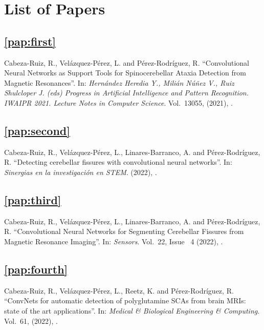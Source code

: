 \chapter{List of Papers}


\section*{\cref{pap:first}}
Cabeza-Ruiz, R., Velázquez-Pérez, L. and Pérez-Rodríguez, R.
\enquote{Convolutional Neural Networks as Support Tools for Spinocerebellar Ataxia Detection from Magnetic Resonances}.
In: \emph{Hernández Heredia Y., Milián Núñez V., Ruiz Shulcloper J. (eds) Progress in Artificial Intelligence and Pattern Recognition. IWAIPR 2021. Lecture Notes in Computer Science}.
Vol.\ 13055,
(2021),
.

\section*{\cref{pap:second}}
Cabeza-Ruiz, R., Velázquez-Pérez, L., Linares-Barranco, A. and Pérez-Rodríguez, R.
\enquote{Detecting cerebellar fissures with convolutional neural networks}.
In: \emph{Sinergias en la investigación en STEM}.
(2022),
.

\section*{\cref{pap:third}}
Cabeza-Ruiz, R., Velázquez-Pérez, L., Linares-Barranco, A. and Pérez-Rodríguez, R.
\enquote{Convolutional Neural Networks for Segmenting Cerebellar Fissures from Magnetic Resonance Imaging}.
In: \emph{Sensors}.
Vol.\ 22,
Issue \ 4
(2022),
.

\section*{\cref{pap:fourth}}
Cabeza-Ruiz, R., Velázquez-Pérez, L., Reetz, K. and Pérez-Rodríguez, R.
\enquote{ConvNets for automatic detection of polyglutamine SCAs from brain MRIs: state of the art applications}.
In: \emph{Medical \& Biological Engineering \& Computing}.
Vol.\ 61,
(2022),
.

